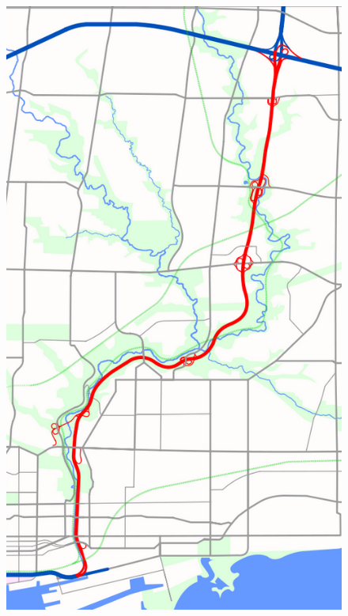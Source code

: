 \documentclass[aspectratio=169]{beamer}
\begin{document}
\begin{frame}
\begin{columns}
\begin{column}{0.3\textwidth}
		\begin{figure}
			\centering
			\includegraphics[width=1\linewidth]{images/dvp_map_wiki.png}
		\end{figure}
		
		
	\end{column}



\end{columns}
		
\end{frame}
\end{document}
